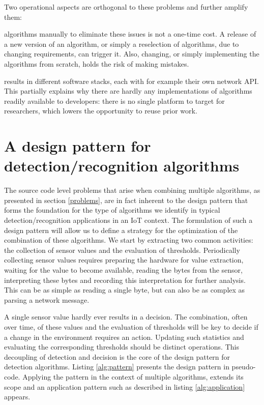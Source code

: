 \documentclass[3p,times,procedia]{elsarticle}
\begin{document}
Two operational aspects are orthogonal to these problems and further amplify
them:

\begin{description}[style=unboxed,leftmargin=0cm]
  
  \item[Reimplementing] algorithms manually to eliminate these issues is not a
  one-time cost. A release of a new version of an algorithm, or simply a
  reselection of algorithms, due to changing requirements, can trigger it.
  Also, changing, or simply implementing the algorithms from scratch, holds the
  risk of making mistakes.

  \item[The heterogeneity of IoT devices] results in different software stacks,
  each with for example their own network API\@. This partially explains why
  there are hardly any implementations of algorithms readily available to
  developers: there is no single platform to target for researchers, which
  lowers the opportunity to reuse prior work.

\end{description}

\section{A design pattern for detection/recognition algorithms}
\label{pattern}

The source code level problems that arise when combining multiple algorithms,
as presented in section \ref{problems}, are in fact inherent to the design
pattern that forms the foundation for the type of algorithms we identify in
typical detection/recognition applications in an IoT context. The formulation
of such a design pattern will allow us to define a strategy for the
optimization of the combination of these algorithms. We start by extracting two
common activities: the collection of sensor values and the evaluation of
thresholds. Periodically collecting sensor values requires preparing the
hardware for value extraction, waiting for the value to become available,
reading the bytes from the sensor, interpreting these bytes and recording this
interpretation for further analysis. This can be as simple as reading a single
byte, but can also be as complex as parsing a network message.

A single sensor value hardly ever results in a decision. The combination, often
over time, of these values and the evaluation of thresholds will be key to
decide if a change in the environment requires an action. Updating such
statistics and evaluating the corresponding thresholds should be distinct
operations. This decoupling of detection and decision is the core of the design
pattern for detection algorithms. Listing \ref{alg:pattern} presents the design
pattern in pseudo-code. Applying the pattern in the context of multiple
algorithms, extends its scope and an application pattern such as described in
listing \ref{alg:application} appears.
\end{document}
